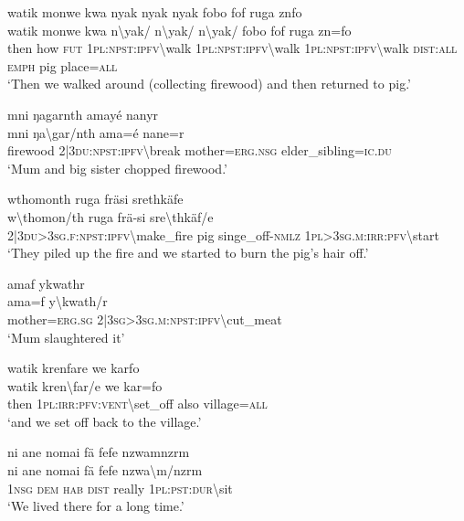 \ea\label{ex:14:a3005}
watik monwe kwa nyak nyak nyak fobo fof ruga znfo\\
\gll watik	monwe	kwa	n{\textbackslash}yak/	n{\textbackslash}yak/	n{\textbackslash}yak/	fobo	fof	ruga	zn=fo\\
     then	how	\textsc{fut}	1\textsc{pl}:\textsc{npst}:\textsc{ipfv}{\textbackslash}walk	1\textsc{pl}:\textsc{npst}:\textsc{ipfv}{\textbackslash}walk	1\textsc{pl}:\textsc{npst}:\textsc{ipfv}{\textbackslash}walk	\textsc{dist}:\textsc{all}	\textsc{emph}	pig	place=\textsc{all}\\
\glt `Then we walked around (collecting firewood) and then returned to pig.'
\z

\ea\label{ex:14:a3008}
mni ŋagarnth amayé nanyr\\
\gll mni	ŋa{\textbackslash}gar/nth	ama=é	nane=r\\
     firewood	2|3\textsc{du}:\textsc{npst}:\textsc{ipfv}{\textbackslash}break	mother=\textsc{erg}.\textsc{nsg}	elder\_sibling=\textsc{ic}.\textsc{du}\\
\glt `Mum and big sister chopped firewood.'
\z

\ea\label{ex:14:a3009}
wthomonth ruga fräsi srethkäfe\\
\gll w{\textbackslash}thomon/th	ruga	frä-si	sre{\textbackslash}thkäf/e\\
     2|3\textsc{du}>3\textsc{sg}.\textsc{f}:\textsc{npst}:\textsc{ipfv}{\textbackslash}make\_fire	pig	singe\_off-\textsc{nmlz}	1\textsc{pl}>3\textsc{sg}.\textsc{m}:\textsc{irr}:\textsc{pfv}{\textbackslash}start\\
\glt `They piled up the fire and we started to burn the pig's hair off.'
\z

\ea\label{ex:14:a3011}
amaf ykwathr\\
\gll ama=f	y{\textbackslash}kwath/r\\
     mother=\textsc{erg}.\textsc{sg}	2|3\textsc{sg}>3\textsc{sg}.\textsc{m}:\textsc{npst}:\textsc{ipfv}{\textbackslash}cut\_meat\\
\glt `Mum slaughtered it'
\z

\ea\label{ex:14:a3012}
watik krenfare we karfo\\
\gll watik	kren{\textbackslash}far/e	we	kar=fo\\
     then	1\textsc{pl}:\textsc{irr}:\textsc{pfv}:\textsc{vent}{\textbackslash}set\_off	also	village=\textsc{all}\\
\glt `and we set off back to the village.'
\z

\ea\label{ex:14:a3014}
ni ane nomai fä fefe nzwamnzrm\\
\gll ni	ane	nomai	fä	fefe	nzwa{\textbackslash}m/nzrm\\
     1\textsc{nsg}	\textsc{dem}	\textsc{hab}	\textsc{dist}	really	1\textsc{pl}:\textsc{pst}:\textsc{dur}{\textbackslash}sit\\
\glt `We lived there for a long time.'
\z

